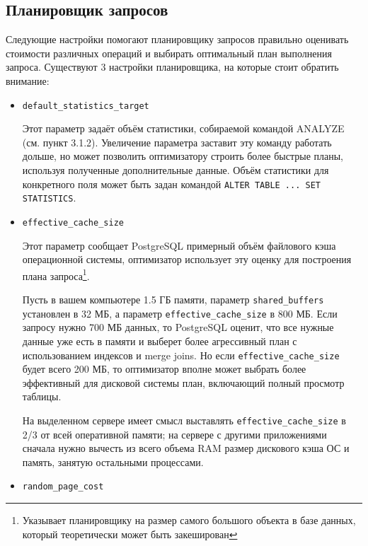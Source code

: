 \subsection{Планировщик запросов}


Следующие настройки помогают планировщику запросов правильно оценивать стоимости различных операций и выбирать оптимальный план выполнения запроса. Существуют 3 настройки планировщика, на которые стоит обратить внимание:

\begin{itemize}
  \item \lstinline!default_statistics_target!

  Этот параметр задаёт объём статистики, собираемой командой ANALYZE (см. пункт 3.1.2). Увеличение параметра заставит эту команду работать дольше, но может позволить оптимизатору строить более быстрые планы, используя полученные дополнительные данные. Объём статистики для конкретного поля может быть задан командой \lstinline!ALTER TABLE ... SET STATISTICS!.

  \item \lstinline!effective_cache_size!

  Этот параметр сообщает PostgreSQL примерный объём файлового кэша операционной системы, оптимизатор использует эту оценку для построения плана запроса\footnote{Указывает планировщику на размер самого большого объекта в базе данных, который теоретически может быть закеширован}.

Пусть в вашем компьютере 1.5 ГБ памяти, параметр \lstinline!shared_buffers! установлен в 32 МБ, а параметр \lstinline!effective_cache_size! в 800 МБ. Если запросу нужно 700 МБ данных, то PostgreSQL оценит, что все нужные данные уже есть в памяти и выберет более агрессивный план с использованием индексов и merge joins. Но если \lstinline!effective_cache_size! будет всего 200 МБ, то оптимизатор вполне может выбрать более эффективный для дисковой системы план, включающий полный просмотр таблицы.

На выделенном сервере имеет смысл выставлять \lstinline!effective_cache_size! в 2/3 от всей оперативной памяти; на сервере с другими приложениями сначала нужно вычесть из всего объема RAM размер дискового кэша ОС и память, занятую остальными процессами.

  \item \lstinline!random_page_cost!


\end{itemize}
